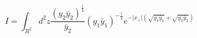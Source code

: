 \begin{equation}
\label{Iint}
I=
\int_{R^2} d^2z\frac{(y_2\bar y_2)^{\frac{1}{4}}}
{\bar y_2}(y_1\bar y_1)^{-\frac{1}{4}}
e^{-|x_\perp|(\sqrt{y_1\bar y_1}+\sqrt{y_2\bar y_2})}
\end{equation}

